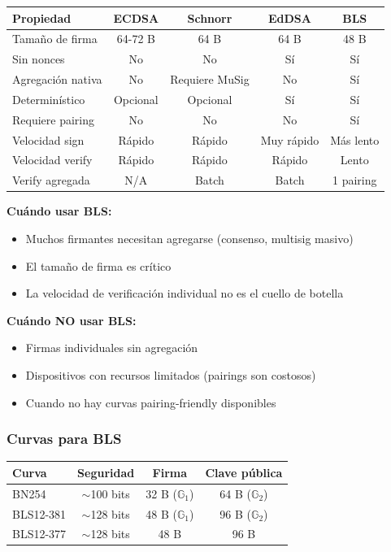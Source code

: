 \documentclass[11pt,a4paper,twoside,openright]{book}
\theoremstyle{definition}
\theoremstyle{plain}
\theoremstyle{remark}
\newcommand{\G}{\mathbb{G}}
\begin{document}
\begin{center}
\begin{tabular}{lcccc}
\toprule
\textbf{Propiedad} & \textbf{ECDSA} & \textbf{Schnorr} & \textbf{EdDSA} & \textbf{BLS} \\
\midrule
Tamaño de firma & 64-72 B & 64 B & 64 B & 48 B \\
Sin nonces & No & No & Sí & Sí \\
Agregación nativa & No & Requiere MuSig & No & Sí \\
Determinístico & Opcional & Opcional & Sí & Sí \\
Requiere pairing & No & No & No & Sí \\
Velocidad sign & Rápido & Rápido & Muy rápido & Más lento \\
Velocidad verify & Rápido & Rápido & Rápido & Lento \\
Verify agregada & N/A & Batch & Batch & 1 pairing \\
\bottomrule
\end{tabular}
\end{center}

\begin{keyidea}
\textbf{Cuándo usar BLS:}
\begin{itemize}
    \item Muchos firmantes necesitan agregarse (consenso, multisig masivo)
    \item El tamaño de firma es crítico
    \item La velocidad de verificación individual no es el cuello de botella
\end{itemize}

\textbf{Cuándo NO usar BLS:}
\begin{itemize}
    \item Firmas individuales sin agregación
    \item Dispositivos con recursos limitados (pairings son costosos)
    \item Cuando no hay curvas pairing-friendly disponibles
\end{itemize}
\end{keyidea}

\subsubsection{Curvas para BLS}

\begin{center}
\begin{tabular}{lccc}
\toprule
\textbf{Curva} & \textbf{Seguridad} & \textbf{Firma} & \textbf{Clave pública} \\
\midrule
BN254 & $\sim$100 bits & 32 B ($\G_1$) & 64 B ($\G_2$) \\
BLS12-381 & $\sim$128 bits & 48 B ($\G_1$) & 96 B ($\G_2$) \\
BLS12-377 & $\sim$128 bits & 48 B & 96 B \\
\bottomrule
\end{tabular}
\end{center}
\end{document}
